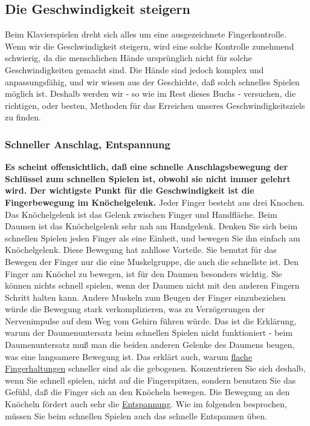 
\subsection{Die Geschwindigkeit steigern}
\label{c1iii7i}

Beim Klavierspielen dreht sich alles um eine ausgezeichnete Fingerkontrolle.
Wenn wir die Geschwindigkeit steigern, wird eine solche Kontrolle zunehmend schwierig, da die menschlichen Hände ursprünglich nicht für solche Geschwindigkeiten gemacht sind.
Die Hände sind jedoch komplex und anpassungsfähig, und wir wissen aus der Geschichte, daß solch schnelles Spielen möglich ist.
Deshalb werden wir - so wie im Rest dieses Buchs - versuchen, die richtigen, oder besten, Methoden für das Erreichen  unseres Geschwindigkeitsziels zu finden.


\subsubsection{Schneller Anschlag, Entspannung}
\label{c1iii7iAnschlag}

\textbf{Es scheint offensichtlich, daß eine schnelle Anschlagsbewegung der Schlüssel zum schnellen Spielen ist, obwohl sie nicht immer gelehrt wird.
Der wichtigste Punkt für die Geschwindigkeit ist die Fingerbewegung im Knöchelgelenk.}
Jeder Finger besteht aus drei Knochen.
Das Knöchelgelenk ist das Gelenk zwischen Finger und Handfläche.
Beim Daumen ist das Knöchelgelenk sehr nah am Handgelenk.
Denken Sie sich beim schnellen Spielen jeden Finger als eine Einheit, und bewegen Sie ihn einfach am Knöchelgelenk.
Diese Bewegung hat zahllose Vorteile.
Sie benutzt für das Bewegen der Finger nur die eine Muskelgruppe, die auch die schnellste ist.
Den Finger am Knöchel zu bewegen, ist für den Daumen besonders wichtig.
Sie können nichts schnell spielen, wenn der Daumen nicht mit den anderen Fingern Schritt halten kann.
Andere Muskeln zum Beugen der Finger einzubeziehen würde die Bewegung stark verkomplizieren, was zu Verzögerungen der Nervenimpulse auf dem Weg vom Gehirn führen würde.
Das ist die Erklärung, warum der Daumenuntersatz beim schnellen Spielen nicht funktioniert - beim Daumenuntersatz muß man die beiden anderen Gelenke des Daumens beugen, was eine langsamere Bewegung ist.
Das erklärt auch, warum \hyperref[c1iii4b]{flache Fingerhaltungen} schneller sind als die gebogenen.
Konzentrieren Sie sich deshalb, wenn Sie schnell spielen, nicht auf die Fingerspitzen, sondern benutzen Sie das Gefühl, daß die Finger sich an den Knöcheln bewegen.
Die Bewegung an den Knöcheln fördert auch sehr die \hyperref[c1ii14]{Entspannung}.
Wie im folgenden besprochen, müssen Sie beim schnellen Spielen auch das schnelle Entspannen üben.

